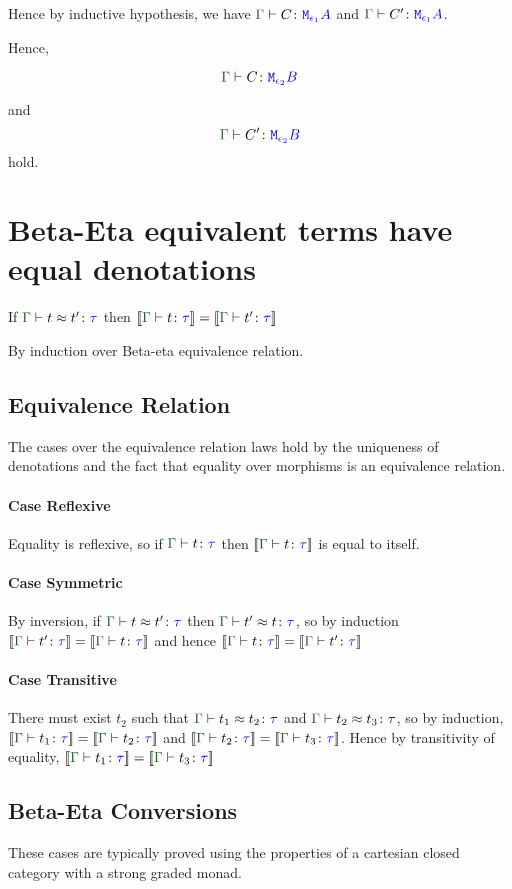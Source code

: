 {Hence by inductive hypothesis, we have $\gtyperelation{C}{\M{\e_1}{A}}$ and $\gtyperelation{C'}{\M{\e_1}{A}}$.

Hence,

\begin{equation}
    \gtyperelation{C}{\M{\e_2}{B}}
\end{equation}

and 
\begin{equation}
    \gtyperelation{C'}{\M{\e_2}{B}}
\end{equation}
hold. 


\section{Beta-Eta equivalent terms have equal denotations}
If $\gberelation{t}{t'}{\tau}$ then $\gdenoequality{t}{t'}{\tau}$

By induction over Beta-eta equivalence relation.
\subsection{Equivalence Relation}
The cases over the equivalence relation laws hold by the uniqueness of denotations and the fact that equality over morphisms is an equivalence relation.
\paragraph{Case Reflexive}
Equality is reflexive, so if $\gtyperelation{t}{\tau}$ then $\deno{\gtyperelation{t}{\tau}}$ is equal to itself.
\paragraph{Case Symmetric}
By inversion, if $\gberelation{t}{t'}{\tau}$ then $\gberelation{t'}{t}{\tau}$, so by induction $\gdenoequality{t'}{t}{\tau}$ and hence $\gdenoequality{t}{t'}{\tau}$
\paragraph{Case Transitive}
There must exist $t_2$ such that $\gberelation{t_1}{t_2}{\tau}$ and $\gberelation{t_2}{t_3}{\tau}$, so by induction,
$\gdenoequality{t_1}{t_2}{\tau}$ and $\gdenoequality{t_2}{t_3}{\tau}$. Hence by transitivity of equality, $\gdenoequality{t_1}{t_3}{\tau}$

\subsection{Beta-Eta Conversions}
These cases are typically proved using the properties of a cartesian closed category with a strong graded monad.

}
